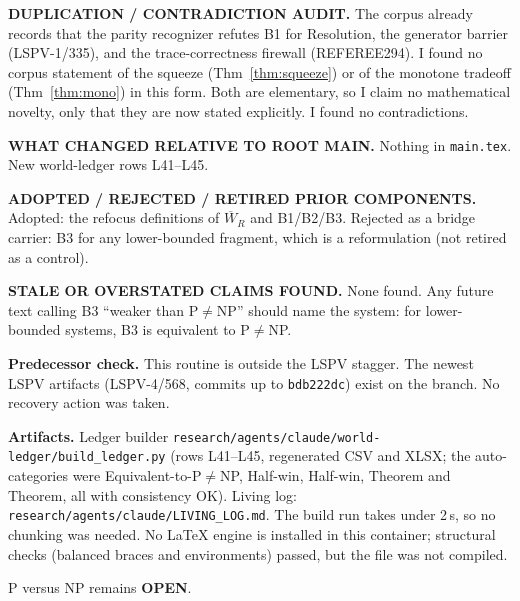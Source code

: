 \documentclass[11pt]{article}
\theoremstyle{definition}
\theoremstyle{remark}
\newcommand{\Wb}{\overline W}
\begin{document}
\textbf{DUPLICATION / CONTRADICTION AUDIT.} The corpus already records that the parity recognizer
refutes B1 for Resolution, the generator barrier (LSPV-1/335), and the trace-correctness firewall
(REFEREE294). I found no corpus statement of the squeeze (Thm~\ref{thm:squeeze}) or of the
monotone tradeoff (Thm~\ref{thm:mono}) in this form. Both are elementary, so I claim no
mathematical novelty, only that they are now stated explicitly. I found no contradictions.

\textbf{WHAT CHANGED RELATIVE TO ROOT MAIN.} Nothing in \texttt{main.tex}. New world-ledger rows
L41--L45.

\textbf{ADOPTED / REJECTED / RETIRED PRIOR COMPONENTS.} Adopted: the refocus definitions of
$\Wb_R$ and B1/B2/B3. Rejected as a bridge carrier: B3 for any lower-bounded fragment, which is a
reformulation (not retired as a control).

\textbf{STALE OR OVERSTATED CLAIMS FOUND.} None found. Any future text calling B3 ``weaker than
P$\ne$NP'' should name the system: for lower-bounded systems, B3 is equivalent to P$\ne$NP.

\textbf{Predecessor check.} This routine is outside the LSPV stagger. The newest LSPV artifacts
(LSPV-4/568, commits up to \texttt{bdb222dc}) exist on the branch. No recovery action was taken.

\textbf{Artifacts.} Ledger builder \texttt{research/agents/claude/world-ledger/build\_ledger.py}
(rows L41--L45, regenerated CSV and XLSX; the auto-categories were Equivalent-to-P$\ne$NP,
Half-win, Half-win, Theorem and Theorem, all with consistency OK). Living log:
\texttt{research/agents/claude/LIVING\_LOG.md}. The build run takes under 2\,s, so no chunking was
needed. No LaTeX engine is installed in this container; structural checks (balanced braces and environments) passed, but the file was not compiled.

\noindent P versus NP remains \textbf{OPEN}.
\end{document}
